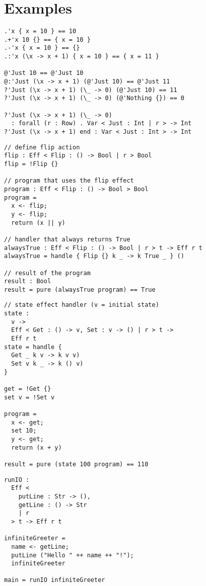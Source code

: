 \documentclass[12pt]{article}
\begin{document}
\newpage
\section{Examples}

\begin{lstlisting}[caption=Records and variants]
.'x { x = 10 } == 10
.+'x 10 {} == { x = 10 }
.-'x { x = 10 } == {}
.:'x (\x -> x + 1) { x = 10 } == { x = 11 }

@'Just 10 == @'Just 10
@:'Just (\x -> x + 1) (@'Just 10) == @'Just 11
?'Just (\x -> x + 1) (\_ -> 0) (@'Just 10) == 11
?'Just (\x -> x + 1) (\_ -> 0) (@'Nothing {}) == 0

?'Just (\x -> x + 1) (\_ -> 0)
  : forall (r : Row) . Var < Just : Int | r > -> Int
?'Just (\x -> x + 1) end : Var < Just : Int > -> Int
\end{lstlisting}

\begin{lstlisting}[caption=Basic effect handlers]
// define flip action
flip : Eff < Flip : () -> Bool | r > Bool
flip = !Flip {}

// program that uses the flip effect
program : Eff < Flip : () -> Bool > Bool
program =
  x <- flip;
  y <- flip;
  return (x || y)

// handler that always returns True
alwaysTrue : Eff < Flip : () -> Bool | r > t -> Eff r t
alwaysTrue = handle { Flip {} k _ -> k True _ } ()

// result of the program
result : Bool
result = pure (alwaysTrue program) == True
\end{lstlisting}

\newpage
\begin{lstlisting}[caption=State effect]
// state effect handler (v = initial state)
state :
  v ->
  Eff < Get : () -> v, Set : v -> () | r > t ->
  Eff r t
state = handle {
  Get _ k v -> k v v)
  Set v k _ -> k () v)
}

get = !Get {}
set v = !Set v

program =
  x <- get;
  set 10;
  y <- get;
  return (x + y)

result = pure (state 100 program) == 110
\end{lstlisting}

\begin{lstlisting}[caption=IO effects]
runIO :
  Eff <
    putLine : Str -> (),
    getLine : () -> Str
    | r
  > t -> Eff r t

infiniteGreeter =
  name <- getLine;
  putLine ("Hello " ++ name ++ "!");
  infiniteGreeter

main = runIO infiniteGreeter
\end{lstlisting}
\end{document}
